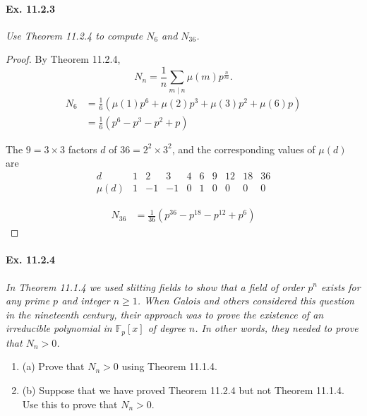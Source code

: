 \documentclass[11pt,a4paper]{article}
\newcommand{\be} {\begin{enumerate}}
\newcommand{\ee} {\end{enumerate}}
\newcommand{\F}{\mathbb{F}}
\begin{document}
\paragraph{Ex. 11.2.3}

{\it Use Theorem 11.2.4 to compute $N_6$ and $N_{36}$.
}

\begin{proof}
 By Theorem 11.2.4,
 $$
 N_n = \frac{1}{n} \sum_{m\mid n} \mu(m) p^{\frac{n}{m}}.
 $$
\begin{align*}
N_6 &= \frac{1}{6}(\mu(1)p^6+\mu(2)p^3+\mu(3)p^2+\mu(6)p)\\
&=\frac{1}{6}(p^6-p^3-p^2+p)
\end{align*}

The $9 = 3\times 3$ factors $d$ of $36=2^2\times 3^2$, and the corresponding values of $\mu(d)$ are
$$
\begin{array}{c|c|c|c|c|c|c|c|c|c}
d         &1 & 2  & 3   &4  &6  & 9 & 12 & 18 & 36   \\
\hline
\mu(d) & 1 & -1 & -1 & 0 & 1 & 0  & 0   & 0  & 0  
\end{array}
$$

\begin{align*}
N_{36} &= \frac{1}{36}(p^{36}-p^{18} -p^{12}+p^6)
\end{align*}
\end{proof}

\paragraph{Ex. 11.2.4}

{\it In Theorem 11.1.4 we used slitting fields to show that a field of order $p^n$ exists for any prime $p$ and integer $n\geq 1$. When Galois and others considered this question in the nineteenth century, their approach was to prove the existence of an irreducible polynomial in $\F_p[x]$ of degree $n$. In other words, they needed to prove that $N_n>0$.
\be
\item[(a)] Prove that $N_n>0$ using Theorem 11.1.4.
\item[(b)] Suppose that we have proved Theorem 11.2.4 but not Theorem 11.1.4. Use this to prove that $N_n>0$.
\ee
}
\end{document}
